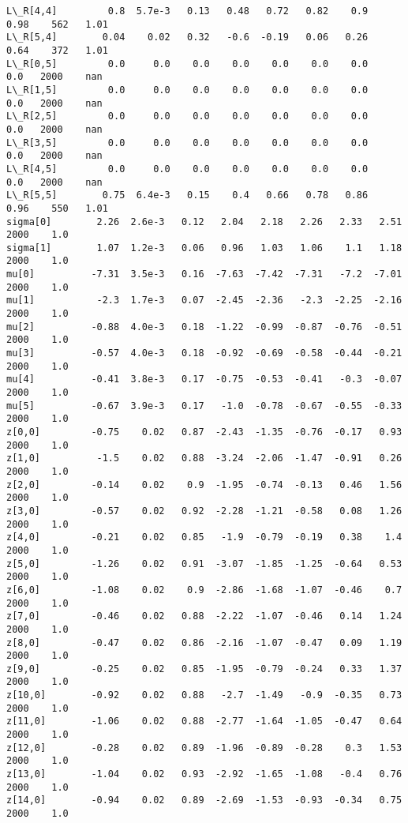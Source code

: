 \documentclass[11pt]{article}
\begin{document}
\begin{Verbatim}[commandchars=\\\{\}]
L\_R[4,4]         0.8  5.7e-3   0.13   0.48   0.72   0.82    0.9   0.98    562   1.01
L\_R[5,4]        0.04    0.02   0.32   -0.6  -0.19   0.06   0.26   0.64    372   1.01
L\_R[0,5]         0.0     0.0    0.0    0.0    0.0    0.0    0.0    0.0   2000    nan
L\_R[1,5]         0.0     0.0    0.0    0.0    0.0    0.0    0.0    0.0   2000    nan
L\_R[2,5]         0.0     0.0    0.0    0.0    0.0    0.0    0.0    0.0   2000    nan
L\_R[3,5]         0.0     0.0    0.0    0.0    0.0    0.0    0.0    0.0   2000    nan
L\_R[4,5]         0.0     0.0    0.0    0.0    0.0    0.0    0.0    0.0   2000    nan
L\_R[5,5]        0.75  6.4e-3   0.15    0.4   0.66   0.78   0.86   0.96    550   1.01
sigma[0]        2.26  2.6e-3   0.12   2.04   2.18   2.26   2.33   2.51   2000    1.0
sigma[1]        1.07  1.2e-3   0.06   0.96   1.03   1.06    1.1   1.18   2000    1.0
mu[0]          -7.31  3.5e-3   0.16  -7.63  -7.42  -7.31   -7.2  -7.01   2000    1.0
mu[1]           -2.3  1.7e-3   0.07  -2.45  -2.36   -2.3  -2.25  -2.16   2000    1.0
mu[2]          -0.88  4.0e-3   0.18  -1.22  -0.99  -0.87  -0.76  -0.51   2000    1.0
mu[3]          -0.57  4.0e-3   0.18  -0.92  -0.69  -0.58  -0.44  -0.21   2000    1.0
mu[4]          -0.41  3.8e-3   0.17  -0.75  -0.53  -0.41   -0.3  -0.07   2000    1.0
mu[5]          -0.67  3.9e-3   0.17   -1.0  -0.78  -0.67  -0.55  -0.33   2000    1.0
z[0,0]         -0.75    0.02   0.87  -2.43  -1.35  -0.76  -0.17   0.93   2000    1.0
z[1,0]          -1.5    0.02   0.88  -3.24  -2.06  -1.47  -0.91   0.26   2000    1.0
z[2,0]         -0.14    0.02    0.9  -1.95  -0.74  -0.13   0.46   1.56   2000    1.0
z[3,0]         -0.57    0.02   0.92  -2.28  -1.21  -0.58   0.08   1.26   2000    1.0
z[4,0]         -0.21    0.02   0.85   -1.9  -0.79  -0.19   0.38    1.4   2000    1.0
z[5,0]         -1.26    0.02   0.91  -3.07  -1.85  -1.25  -0.64   0.53   2000    1.0
z[6,0]         -1.08    0.02    0.9  -2.86  -1.68  -1.07  -0.46    0.7   2000    1.0
z[7,0]         -0.46    0.02   0.88  -2.22  -1.07  -0.46   0.14   1.24   2000    1.0
z[8,0]         -0.47    0.02   0.86  -2.16  -1.07  -0.47   0.09   1.19   2000    1.0
z[9,0]         -0.25    0.02   0.85  -1.95  -0.79  -0.24   0.33   1.37   2000    1.0
z[10,0]        -0.92    0.02   0.88   -2.7  -1.49   -0.9  -0.35   0.73   2000    1.0
z[11,0]        -1.06    0.02   0.88  -2.77  -1.64  -1.05  -0.47   0.64   2000    1.0
z[12,0]        -0.28    0.02   0.89  -1.96  -0.89  -0.28    0.3   1.53   2000    1.0
z[13,0]        -1.04    0.02   0.93  -2.92  -1.65  -1.08   -0.4   0.76   2000    1.0
z[14,0]        -0.94    0.02   0.89  -2.69  -1.53  -0.93  -0.34   0.75   2000    1.0

\end{Verbatim}
\end{document}
